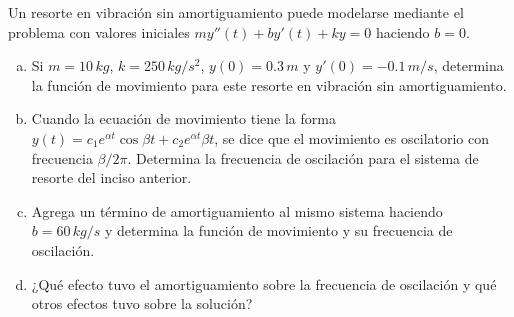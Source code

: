 \documentclass[12pt]{exam}
\begin{document}
\begin{questions}
     

     \question%
     Un resorte en vibración sin amortiguamiento puede modelarse mediante el problema con valores iniciales $my''(t)+by'(t)+ky=0$ haciendo $b=0$.
     \begin{enumerate}[a)]
         \item Si $m=10\, kg$, $k=250\,kg/s^2$, $y(0)=0.3\,m$ y $y'(0)=-0.1\,m/s$, determina la función de movimiento para este resorte en vibración sin amortiguamiento.
         \item Cuando la ecuación de movimiento tiene la forma $y(t)=c_1e^{\alpha t}\cos\beta t+c_2e^{\alpha t}\beta t$, se dice que el movimiento es oscilatorio con frecuencia $\beta/2\pi$. Determina la frecuencia de oscilación para el sistema de resorte del inciso anterior.
         \item Agrega un término de amortiguamiento al mismo sistema haciendo $b=60\,kg/s$ y determina la función de movimiento y su frecuencia de oscilación.
         \item ¿Qué efecto tuvo el amortiguamiento sobre la frecuencia de oscilación y qué otros efectos tuvo sobre la solución?
     \end{enumerate}
   
        \end{questions}
\end{document}
